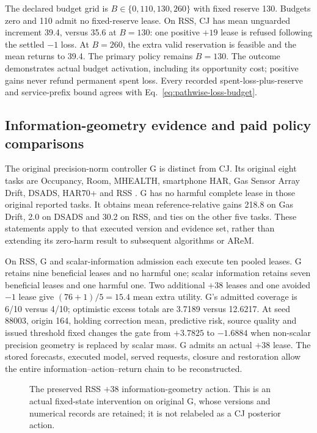 \documentclass[10pt]{article}
\begin{document}
The declared budget grid is $B\in\{0,110,130,260\}$ with fixed reserve
130. Budgets zero and 110 admit no fixed-reserve lease. On RSS, CJ has
mean unguarded increment 39.4, versus 35.6 at $B=130$: one positive
$+19$ lease is refused following the settled $-1$ loss. At $B=260$,
the extra valid reservation is feasible and the mean returns to 39.4.
The primary policy remains $B=130$. The outcome demonstrates actual
budget activation, including its opportunity cost; positive gains never
refund permanent spent loss. Every recorded spent-loss-plus-reserve and
service-prefix bound agrees with Eq.~\eqref{eq:pathwise-loss-budget}.

\subsection{Information-geometry evidence and paid policy comparisons}
The original precision-norm controller G is distinct from CJ. Its original
eight tasks are Occupancy, Room, MHEALTH, smartphone HAR, Gas Sensor
Array Drift, DSADS, HAR70+ and RSS
\cite{occupancy357,occupancy864,mhealth319,har240,gas224,dsads256,har780,rss348}.
G has no harmful complete lease in those original reported tasks.
It obtains mean reference-relative gains 218.8 on Gas Drift, 2.0 on
DSADS and 30.2 on RSS, and ties on the other five tasks. These statements
apply to that executed version and evidence set, rather than extending
its zero-harm result to subsequent algorithms or AReM.

On RSS, G and scalar-information admission each execute ten pooled leases.
G retains nine beneficial leases and no harmful one; scalar information
retains seven beneficial leases and one harmful one. Two additional $+38$
leases and one avoided $-1$ lease give $(76+1)/5=15.4$ mean extra utility.
G's admitted coverage is 6/10 versus 4/10; optimistic excess totals are
3.7189 versus 12.6217. At seed 88003, origin 164, holding correction
mean, predictive risk, source quality and issued threshold fixed changes
the gate from $+3.7825$ to $-1.6884$ when non-scalar precision geometry
is replaced by scalar mass. G admits an actual $+38$ lease. The stored
forecasts, executed model, served requests, closure and restoration allow
the entire information--action--return chain to be reconstructed.

\begin{figure}[t]
\centering
{}
\caption{The preserved RSS $+38$ information-geometry action. This is an
actual fixed-state intervention on original G, whose versions and numerical
records are retained; it is not relabeled as a CJ posterior action.}
\label{fig:preserved-rss-geometry}
\end{figure}
\end{document}
